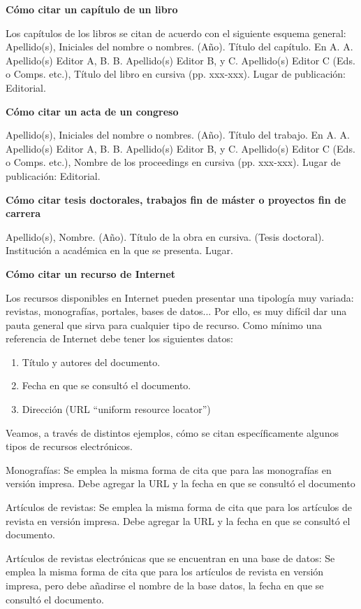 \documentclass[spanish,12pt, a4paper, twoside]{paper}
\begin{document}
\bigskip
{\bf Cómo citar un capítulo de un libro}

Los capítulos de los libros se citan de acuerdo con el siguiente esquema general:
Apellido(s), Iniciales del nombre o nombres. (Año). Título del capítulo. En A. A. Apellido(s) Editor A, B. B. Apellido(s) Editor B, y C. Apellido(s) Editor C (Eds. o Comps. etc.), Título del libro en cursiva (pp. xxx-xxx). Lugar de publicación: Editorial.

\bigskip
{\bf Cómo citar un acta de un congreso}

Apellido(s), Iniciales del nombre o nombres. (Año). Título del trabajo. En A. A. Apellido(s) Editor A, B. B. Apellido(s) Editor B, y C. Apellido(s) Editor C (Eds. o Comps. etc.), Nombre de los proceedings en cursiva (pp. xxx-xxx). Lugar de publicación: Editorial.

\bigskip
{\bf Cómo citar tesis doctorales, trabajos fin de máster o proyectos fin de carrera}

Apellido(s), Nombre. (Año). Título de la obra en cursiva. (Tesis doctoral). Institución a académica en la que se presenta. Lugar.

\bigskip
{\bf Cómo citar un recurso de Internet}

Los recursos disponibles en Internet pueden presentar una tipología muy variada: revistas, monografías, portales, bases de datos... Por ello, es muy difícil dar una pauta general que sirva para cualquier tipo de recurso.
Como mínimo una referencia de Internet debe tener los siguientes datos:
\begin{enumerate}
\item Título y autores del documento.
\item Fecha en que se consultó el documento.
\item Dirección (URL “uniform resource locator”)
\end{enumerate}

Veamos, a través de distintos ejemplos, cómo se citan específicamente algunos tipos de recursos electrónicos.

Monografías:
Se emplea la misma forma de cita que para las monografías en versión impresa. Debe agregar la URL y la fecha en que se consultó el documento

Artículos de revistas:
Se emplea la misma forma de cita que para los artículos de revista en versión impresa. Debe agregar la URL y la fecha en que se consultó el documento.

Artículos de revistas electrónicas que se encuentran en una base de datos:
Se emplea la misma forma de cita que para los artículos de revista en versión impresa, pero debe añadirse el nombre de la base datos, la fecha en que se consultó el documento.
\end{document}
